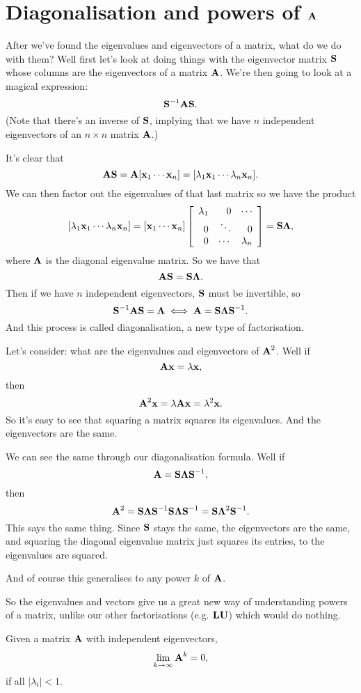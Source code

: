 \section{Diagonalisation and powers of $\mA$}

After we've found the eigenvalues and eigenvectors of a matrix, what do we do with them? Well first let's look at doing things with the eigenvector matrix $\mS$ whose columns are the eigenvectors of a matrix $\mA$. We're then going to look at a magical expression:
\[ \mS^{-1} \mA \mS. \]
(Note that there's an inverse of $\mS$, implying that we have $n$ independent eigenvectors of an $n \times n$ matrix $\mA$.)

It's clear that
\[ \mA\mS = \mA[\vx_1 \cdots \vx_n] = [\lambda_1\vx_1 \cdots \lambda_n\vx_n]. \]
We can then factor out the eigenvalues of that last matrix so we have the product
\[ [\lambda_1\vx_1 \cdots \lambda_n\vx_n] = [\vx_1 \cdots \vx_n]\mat{\lambda_1&0&\cdots\\0&\ddots&0\\0&\cdots&\lambda_n} = \mS\mLa, \]
where $\mLa$ is the diagonal eigenvalue matrix. So we have that
\[ \mA \mS = \mS \mLa. \]
Then if we have $n$ independent eigenvectors, $\mS$ must be invertible, so
\[ \mS^{-1}\mA\mS = \mLa \iff \mA = \mS\mLa\mS^{-1}. \]
And this process is called diagonalisation, a new type of factorisation.

\bex
Let's consider: what are the eigenvalues and eigenvectors of $\mA^2$. Well if
\[ \mA \vx = \lambda \vx, \]
then
\[ \mA^2 \vx = \lambda \mA \vx = \lambda^2 \vx. \]
So it's easy to see that squaring a matrix squares its eigenvalues. And the eigenvectors are the same. 

We can see the same through our diagonalisation formula. Well if 
\[\mA = \mS\mLa\mS^{-1}, \]
then 
\[ \mA^2 = \mS\mLa\mS^{-1}\mS\mLa\mS^{-1} = \mS\mLa^2\mS^{-1}. \]
This says the same thing. Since $\mS$ stays the same, the eigenvectors are the same, and squaring the diagonal eigenvalue matrix just squares its entries, to the eigenvalues are squared.

And of course this generalises to any power $k$ of $\mA$.
\eex

So the eigenvalues and vectors give us a great new way of understanding powers of a matrix, unlike our other factorisations (e.g. $\mL\mU$) which would do nothing. 

\btm
Given a matrix $\mA$ with independent eigenvectors, 
\[ \lim_{k \to \infty} \mA^k = 0, \]
if all $|\lambda_i| < 1$. 
\etm

